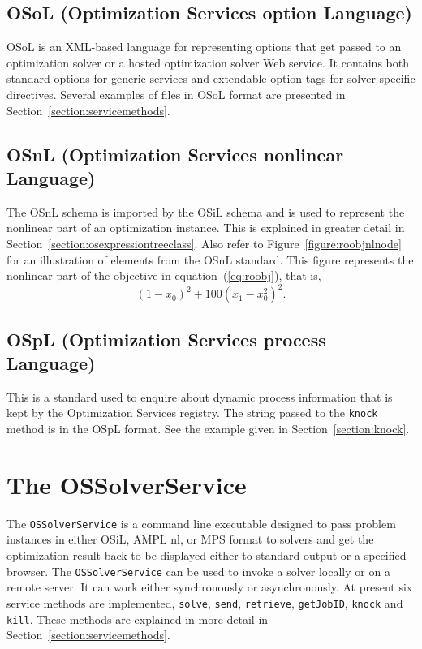 \documentclass[11pt]{article}
\newcounter{Fig}
\renewcommand{\_}{{\char"5F}}
\renewcommand{\{}{{\char"7B}}
\renewcommand{\}}{{\char"7D}}
\renewcommand{\^}{{\char"0D}}
\renewcommand{\'}{{\char"0D}}
\begin{document}
\begin{enumerate}[Step 1:]
\subsection{OSoL (Optimization Services option Language)} \label{section:osolschema}
OSoL is
an XML-based language for representing options that get passed to an optimization solver or a hosted optimization
solver Web service. It contains both standard options for generic services and extendable option tags for
solver-specific directives.
Several examples of files in OSoL format are presented in Section~\ref{section:servicemethods}.%

\subsection{OSnL (Optimization Services nonlinear Language)} \label{section:osnlschema}
The OSnL schema is imported by the OSiL schema and is used 
to represent the nonlinear part of an optimization instance. 
This is explained in greater detail in Section~\ref{section:osexpressiontreeclass}. Also refer to
Figure~\ref{figure:roobjnlnode} for an illustration of elements from the OSnL standard. This figure represents
the nonlinear part of the objective in equation~(\ref{eq:roobj}), that is,
%
$$
(1-x_0)^2 + 100 (x_1-x_0^2)^2.
$$

\subsection{OSpL (Optimization Services process Language)} \label{section:osplschema}
This is a standard used to enquire about dynamic process information that 
is kept by the Optimization Services registry. The string passed to the {\tt knock} 
method is in the OSpL format. See the example given in Section~\ref{section:knock}.


\section{The OSSolverService}\label{section:ossolverservice}

The {\tt OSSolverService} is a command line executable designed
to pass problem instances in either  OSiL, AMPL nl, or MPS format
to solvers and get the optimization result back to be displayed either to standard output or a specified browser.
The {\tt OSSolverService} can be used to invoke a solver locally or on a remote server. It can work either synchronously
or asynchronously. At present six service methods are implemented, {\tt solve},
{\tt send}, {\tt retrieve},
{\tt getJobID}, {\tt knock} and {\tt kill}.
These methods are explained in more detail in Section~\ref{section:servicemethods}.


\end{enumerate}
\end{document}
